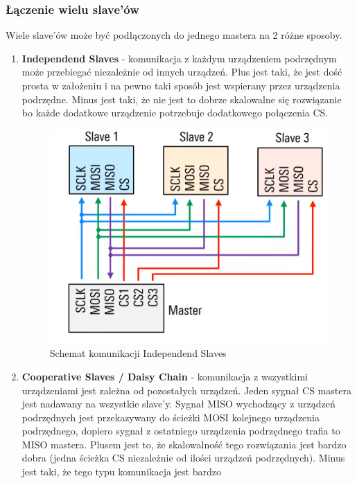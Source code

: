 \documentclass[11pt]{article}
\begin{document}
\subsubsection{Łączenie wielu slave'ów}
Wiele slave'ów może być podłączonych do jednego mastera na 2 różne sposoby.
\begin{enumerate}
    \item {
        \textbf{Independend Slaves} - komunikacja z każdym urządzeniem podrzędnym 
        może przebiegać niezależnie od innych urządzeń. Plus jest taki, że jest dość 
        prosta w założeniu i na pewno taki sposób jest wspierany przez urządzenia podrzędne.
        Minus jest taki, że nie jest to dobrze skalowalne się rozwiązanie bo każde dodatkowe
        urządzenie potrzebuje dodatkowego połączenia CS.
        \begin{figure}[H]
            \includegraphics[width=\textwidth]{SPI_independent_slaves.png}
            \caption{Schemat komunikacji Independend Slaves}
        \end{figure}
    }
    \item {
        \textbf{Cooperative Slaves / Daisy Chain} - komunikacja z wszystkimi urządzeniami
        jest zależna od pozostałych urządzeń. Jeden sygnał CS mastera jest nadawany
        na wszystkie slave'y. Sygnał MISO wychodzący z urządzeń podrzędnych
        jest przekazywany do ścieżki MOSI kolejnego urządzenia podrzędnego, dopiero
        sygnał z ostatniego urządzenia podrzędnego trafia to MISO mastera. Plusem jest to,
        że skalowalność tego rozwiązania jest bardzo dobra (jedna ścieżka CS niezależnie od
        ilości urządzeń podrzędnych). Minus jest taki, że tego typu komunikacja jest bardzo
}
\end{enumerate}
\end{document}
